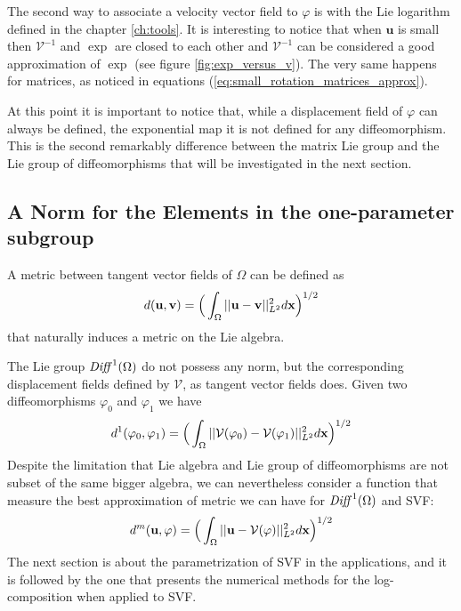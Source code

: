 The second way to associate a velocity vector field to $\varphi$ is with the Lie logarithm defined in the chapter \ref{ch:tools}. It is interesting to notice that when $\mathbf{u}$ is small then $\mathcal{V}^{-1}$ and $\exp$ are closed to each other and $\mathcal{V}^{-1}$ can be considered a good approximation of $\exp$ (see figure \ref{fig:exp_versus_v}). The very same happens for matrices, as noticed in equations (\ref{eq:small_rotation_matrices_approx}).

At this point it is important to notice that, while a displacement field of $\varphi$ can always be defined, the exponential map it is not defined for any diffeomorphism. This is the second remarkably difference between the matrix Lie group and the Lie group of diffeomorphisms that will be investigated in the next section.



\subsection{A Norm for the Elements in the one-parameter subgroup}\label{subse:norm}
A metric between tangent vector fields of $\Omega$ can be defined as 
\begin{align}\label{def:metric_two_svf}
d(\mathbf{u}, \mathbf{v}) 
= 
\Big( \int_{\Omega} \vert\lvert \mathbf{u} - \mathbf{v} \rvert\vert_{L^2}^{2} d\mathbf{x} \Big)^{1/2}
\end{align} 
that naturally induces a metric on the Lie algebra.

The Lie group $\text{\emph{Diff}}^{1}(\Omega)$ do not possess any norm, but the corresponding displacement fields defined by $\mathcal{V}$, as tangent vector fields does. Given two diffeomorphisms $\varphi_0$ and $\varphi_1$ we have
\begin{align}\label{def:metric_two_displacement_field}
d^{1}(\varphi_0,\varphi_1) 
= 
\Big( \int_{\Omega} \vert\lvert \mathcal{V}(\varphi_0) - \mathcal{V}(\varphi_1) \rvert\vert_{L^2}^{2} d\mathbf{x} \Big)^{1/2}
\end{align} 
Despite the limitation that Lie algebra and Lie group of diffeomorphisms are not subset of the same bigger algebra, we can nevertheless consider a function that measure the best approximation of metric we can have for $\text{\emph{Diff}}^{1}(\Omega)$ and SVF:
\begin{align}\label{def:metric_one_svf_one_displacement_field}
d^{m}(\mathbf{u},\varphi) 
= 
\Big(\int_{\Omega} \vert\lvert \mathbf{u} - \mathcal{V}(\varphi) \rvert\vert_{L^2}^{2} d\mathbf{x} \Big)^{1/2}
\end{align} 
The next section is about the parametrization of SVF in the applications, and it is followed by the one that presents the numerical methods for the log-composition when applied to SVF.

